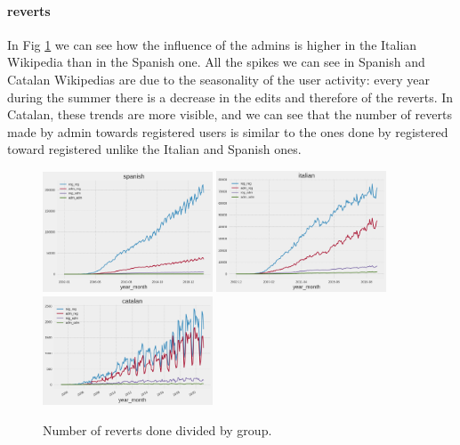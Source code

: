\paragraph*{reverts}
In Fig \ref{fig:compare} we can see how the influence of the admins is higher in the Italian
Wikipedia than in the Spanish one. All the spikes we can see in Spanish and Catalan Wikipedias are due to the
seasonality of the user activity: every year during the summer there is a decrease in the edits and
therefore of the reverts. In Catalan, these trends are more visible, and we can see that the number of
reverts made by admin towards registered users is similar to the ones done by registered toward
registered unlike the Italian and Spanish ones. 
\begin{figure}[H]
    \centering
    \includegraphics[width=0.45\textwidth]{./chapters/04/assets/admin_es.png}
    \includegraphics[width=0.45\textwidth]{./chapters/04/assets/admin_it.png}
    \includegraphics[width=0.45\textwidth]{./chapters/04/assets/admin_ca.png}
    \caption{Number of reverts done divided by group.}
    \label{fig:compare}
\end{figure}
